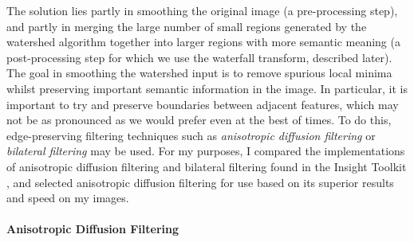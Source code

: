 
The solution lies partly in smoothing the original image (a pre-processing step), and partly in merging the large number of small regions generated by the watershed algorithm together into larger regions with more semantic meaning (a post-processing step for which we use the waterfall transform, described later). The goal in smoothing the watershed input is to remove spurious local minima whilst preserving important semantic information in the image. In particular, it is important to try and preserve boundaries between adjacent features, which may not be as pronounced as we would prefer even at the best of times. To do this, edge-preserving filtering techniques such as \emph{anisotropic diffusion filtering} \cite{perona90} or \emph{bilateral filtering} \cite{tomasi98} may be used. For my purposes, I compared the implementations of anisotropic diffusion filtering and bilateral filtering found in the Insight Toolkit \cite{itk}, and selected anisotropic diffusion filtering for use based on its superior results and speed on my images.

\paragraph{Anisotropic Diffusion Filtering}

